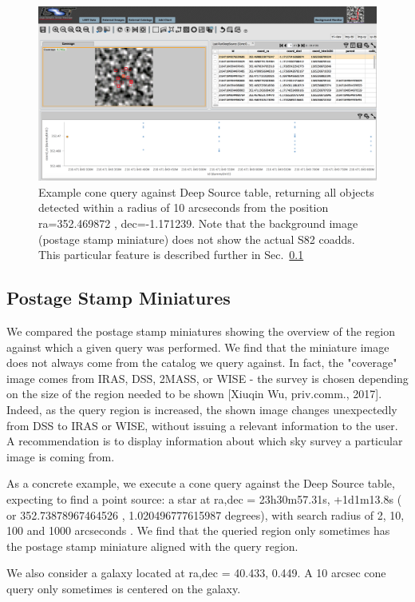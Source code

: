 \documentclass[fleqn,usenatbib]{mnras} %
\begin{document}
\begin{figure}
\includegraphics[width=\textwidth]{figs/3_PDAC_cone_DeepSource}
\caption{Example cone query against Deep Source table, returning all objects detected within a radius of 10 arcseconds from the position ra=352.469872 , dec=-1.171239. Note that the background image (postage stamp miniature) does not show the actual S82 coadds. This particular feature is described further in Sec.~\ref{sec:miniatures}}
\label{fig:PDAC_cone_DS}
\end{figure}


\subsection{Postage Stamp Miniatures }
\label{sec:miniatures}
We compared the postage stamp miniatures showing the overview of the region against which a given query was performed. We find that the miniature image does not always come from the catalog we query against.  In fact, the "coverage" image comes from IRAS, DSS, 2MASS, or WISE -  the survey is chosen depending on the size of the region needed to be shown [Xiuqin Wu, priv.comm., 2017].  Indeed, as the query region is increased,  the shown image changes unexpectedly from DSS to IRAS or WISE, without issuing a relevant information to the user.  A recommendation is to display information about which sky survey a particular image is coming from.  

As a concrete example, we execute a cone query against the Deep Source table,  expecting to find  a point source: a star at ra,dec = 23h30m57.31s, +1d1m13.8s  ( or 352.73878967464526 ,  1.020496777615987 degrees), with search radius of 2, 10, 100 and 1000 arcseconds . We find that the queried region only sometimes has the postage stamp miniature aligned with the query region. 

We also consider a galaxy located at ra,dec =  40.433,  0.449. A 10 arcsec cone query only sometimes is centered on the galaxy. 
\end{document}
